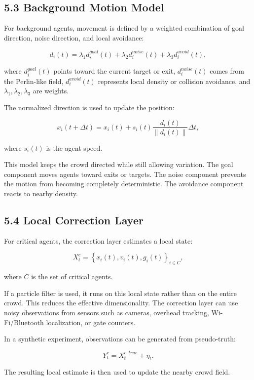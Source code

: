 \documentclass[
  11pt,
]{article}
\begin{document}
\subsection{5.3 Background Motion Model}\label{background-motion-model}

For background agents, movement is defined by a weighted combination of
goal direction, noise direction, and local avoidance:

\[
d_i(t)
=
\lambda_1 d_i^{goal}(t)
+
\lambda_2 d_i^{noise}(t)
+
\lambda_3 d_i^{avoid}(t),
\]

where \(d_i^{goal}(t)\) points toward the current target or exit,
\(d_i^{noise}(t)\) comes from the Perlin-like field, \(d_i^{avoid}(t)\)
represents local density or collision avoidance, and
\(\lambda_1,\lambda_2,\lambda_3\) are weights.

The normalized direction is used to update the position:

\[
x_i(t+\Delta t)
=
x_i(t)
+
s_i(t)
\frac{d_i(t)}{\|d_i(t)\|}
\Delta t,
\]

where \(s_i(t)\) is the agent speed.

This model keeps the crowd directed while still allowing variation. The
goal component moves agents toward exits or targets. The noise component
prevents the motion from becoming completely deterministic. The
avoidance component reacts to nearby density.

\subsection{5.4 Local Correction Layer}\label{local-correction-layer}

For critical agents, the correction layer estimates a local state:

\[
X_t^c =
\left\{x_i(t), v_i(t), g_i(t)\right\}_{i \in C},
\]

where \(C\) is the set of critical agents.

If a particle filter is used, it runs on this local state rather than on
the entire crowd. This reduces the effective dimensionality. The
correction layer can use noisy observations from sensors such as
cameras, overhead tracking, Wi-Fi/Bluetooth localization, or gate
counters.

In a synthetic experiment, observations can be generated from
pseudo-truth:

\[
Y_t^c = X_t^{c,true} + \eta_t.
\]

The resulting local estimate is then used to update the nearby crowd
field.
\end{document}
